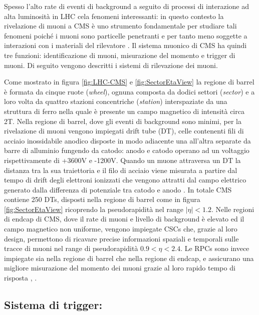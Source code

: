 Spesso l'alto rate di eventi di background a seguito di processi di interazione ad alta luminosità in LHC cela fenomeni interessanti: in questo contesto la rivelazione di muoni a CMS è uno strumento fondamentale per studiare tali fenomeni poiché i muoni sono particelle penetranti e per tanto meno soggette a interazioni con i materiali del rilevatore \cite{cms2008cms}. Il sistema muonico di CMS ha quindi tre funzioni: identificazione di muoni, misurazione del momento e trigger di muoni. Di seguito vengono descritti i sistemi di rilevazione dei muoni.


Come mostrato in figura \ref{fig:LHC-CMS} e \ref{fig:SectorEtaView} la regione di barrel è formata da cinque ruote (\textit{wheel}), ognuna composta da dodici settori (\textit{sector}) e a loro volta da quattro stazioni concentriche (\textit{station}) interspaziate da una struttura di ferro nella quale è presente un campo magnetico di intensità circa 2T. Nella regione di barrel, dove gli eventi di background sono minimi, per la rivelazione di muoni vengono impiegati drift tube (DT), celle contenenti fili di acciaio inossidabile anodico disposte in modo adiacente una all'altra separate da barre di alluminio fungendo da catodo: anodo e catodo operano ad un voltaggio rispettivamente di +3600V e -1200V. Quando un muone attraversa un DT la distanza tra la sua traiettoria e il filo di acciaio viene misurata a partire dal tempo di drift degli elettroni ionizzati che vengono attratti dal campo elettrico generato dalla differenza di potenziale tra catodo e anodo \cite{MasterThesisNicLai}. \newline
In totale CMS contiene 250 DTs, disposti nella regione di barrel come in figura \ref{fig:SectorEtaView} ricoprendo la pseudorapidità nel range $|\eta| < 1.2$. \newline
Nelle regioni di endcap di CMS, dove il rate di muoni e livello di background è elevato ed il campo magnetico non uniforme, vengono impiegate CSCs che, grazie al loro design, permettono di ricavare precise informazioni spaziali e temporali sulle tracce di muoni nel range di pseudorapidità $0.9 < \eta < 2.4$. Le RPCs sono invece impiegate sia nella regione di barrel che nella regione di endcap, e assicurano una migliore misurazione del momento dei muoni grazie al loro rapido tempo di risposta \cite{MasterThesisNicLai}, \cite{cms2008cms}.


\subsection{Sistema di trigger:}
\label{sec:SistemaDiTrigger}

